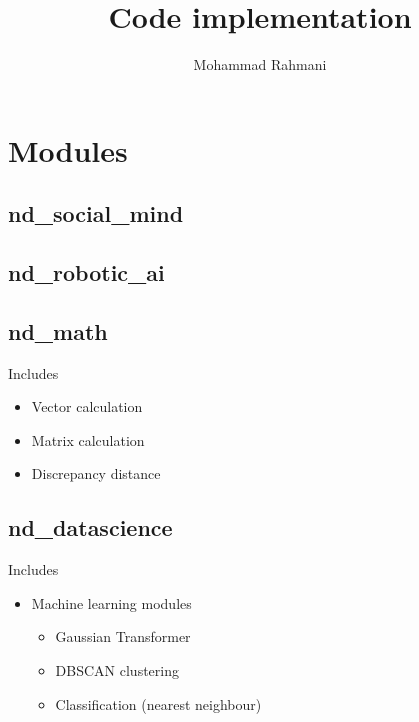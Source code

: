\documentclass[a4paper]{article}
\title{Code implementation}
\date{}
\author{Mohammad Rahmani}
\begin{document}
   \maketitle
   \section{Modules}
      \subsection{nd\_social\_mind}



      \subsection{nd\_robotic\_ai}



      \subsection{nd\_math}


         Includes
         \begin{itemize}
            \item Vector calculation
            \item Matrix calculation
            \item Discrepancy distance
         \end{itemize}


      \subsection{nd\_datascience}


         Includes
         \begin{itemize}
            \item Machine learning modules
            \begin{itemize}
               \item Gaussian Transformer
               \item DBSCAN clustering
               \item Classification (nearest neighbour)
            \end{itemize}
            
         \end{itemize}
\end{document}
